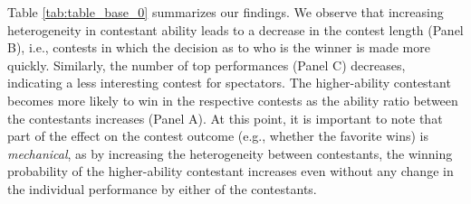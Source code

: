 \documentclass[11pt,a4paper]{article}
\begin{document}
Table \ref{tab:table_base_0} summarizes our findings. We observe that increasing heterogeneity in contestant ability leads to a decrease in the contest length (Panel B), i.e., contests in which the decision as to who is the winner is made more quickly.
Similarly, the number of top performances (Panel C) decreases, indicating a less interesting contest for spectators. The higher-ability contestant becomes more likely to win in the respective contests as the ability ratio between the contestants increases (Panel A). At this point, it is important to note that part of the effect on the contest outcome (e.g., whether the favorite wins) is \textit{mechanical}, as by increasing the heterogeneity between contestants, the winning probability of the higher-ability contestant increases even without any change in the individual performance by either of the contestants.\par 
\end{document}
